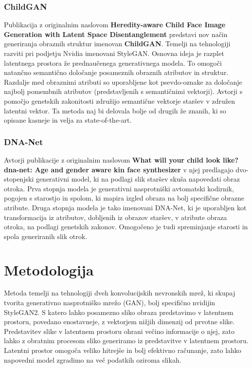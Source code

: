 \documentclass[a4paper,12pt,openright]{book}
\begin{document}
\subsection{ChildGAN}
Publikacija z originalnim naslovom \textbf{Heredity-aware Child Face Image Generation with Latent Space Disentanglement} \cite{cui2021heredity} predstavi nov način generiranja obraznih struktur imenovan \textbf{ChildGAN}. Temelji na tehnologiji razviti pri podjetju Nvidia imenovani StyleGAN. Osnovna ideja je razplet latentnega prostora že prednaučenega generativnega modela. To omogoči natančno semantično določanje posameznih obraznih atributov in struktur. Razdalje med obraznimi atributi so uporabljene kot psevdo-oznake za določanje najbolj pomembnih atributov (predstavljenih s semantičnimi vektorji). Avtorji s pomočjo genetskih zakonitosti združijo semantične vektorje staršev v združen latentni vektor. Ta metoda naj bi delovala bolje od drugih že znanih, ki so opisane kasneje in velja za state-of-the-art.
\subsection{DNA-Net}
Avtorji publikacije z originalnim naslovom \textbf{What will your child look like? dna-net: Age and gender aware kin face synthesizer} \cite{Gao2021WhatWY} v njej predlagajo dvo-stopenjski generativni model, ki na podlagi slik staršev skuša napovedati obraz otroka. Prva stopnja modela je generativni nasprotniški avtomatski kodirnik, pogojen s starostjo in spolom, ki mapira izgled obraza na bolj specifične obrazne atribute. Druga stopnja modela je tako imenovani DNA-Net, ki je uporabljen kot transformacija iz atributov, dobljenih iz obrazov staršev, v atribute obraza otroka, na podlagi genetskih zakonov. Omogočeno je tudi spreminjanje starosti in spola generiranih slik otrok.



\chapter{Metodologija}
Metoda temelji na tehnologiji dveh konvolucijskih nevronskih mrež, ki skupaj tvorita generativno nasprotniško mrežo (GAN), bolj specifično nvidijin StyleGAN2. S katero lahko posamezno sliko obraza predstavimo v latentnem prostoru, povedano enostavneje, z vektorjem nižjih dimenzij od prvotne slike. Predstavitev slike v latentnem prostoru ohrani večino informacije o njej, zato lahko z obratnim procesom sliko generiramo iz predstavitve v latentnem prostoru. Latentni prostor omogoča veliko hitrejše in bolj efektivno računanje, zato lahko napovedni model zgradimo na več podatkih oziroma slikah. 
\end{document}
